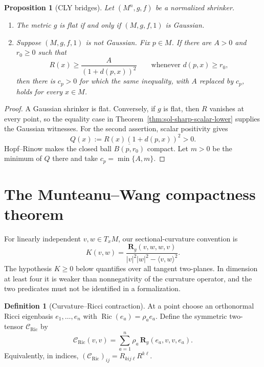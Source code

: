 \documentclass[10pt]{coll-l}
\newtheorem{proposition}[theorem]{Proposition}
\theoremstyle{definition}
\newtheorem{definition}[theorem]{Definition}
\theoremstyle{remark}
\numberwithin{section}{chapter}
\numberwithin{equation}{chapter}
\newcommand{\Ric}{\operatorname{Ric}}
\begin{document}
\begin{proposition}[CLY bridges]
\label{prop:sol-cly-source-bridges}
Let $(M^n,g,f)$ be a normalized shrinker.
\begin{enumerate}
\item The metric $g$ is flat if and only if $(M,g,f,1)$ is Gaussian.
\item Suppose $(M,g,f,1)$ is not Gaussian.  Fix $p\in M$.  If there are
      $A>0$ and $r_0\geq0$ such that
      \[
       R(x)\geq\frac{A}{(1+d(p,x))^2}
       \qquad\text{whenever }d(p,x)\geq r_0,
      \]
      then there is $c_p>0$ for which the same inequality, with $A$
      replaced by $c_p$, holds for every $x\in M$.
\end{enumerate}
\end{proposition}

\begin{proof}
A Gaussian shrinker is flat.  Conversely, if $g$ is flat, then $R$ vanishes
at every point, so the equality case in
Theorem~\ref{thm:sol-sharp-scalar-lower} supplies the Gaussian witnesses.
For the second assertion, scalar positivity gives
\[
             Q(x):=R(x)(1+d(p,x))^2>0.
\]
Hopf--Rinow makes the closed ball $\overline{B(p,r_0)}$ compact.  Let $m>0$
be the minimum of $Q$ there and take $c_p=\min\{A,m\}$.
\end{proof}

\section{The Munteanu--Wang compactness theorem}
\label{sec:sol-mw}

For linearly independent $v,w\in T_xM$, our sectional-curvature convention
is
\begin{equation}
 K(v,w)=
 \frac{\mathbf R_g(v,w,w,v)}{|v|^2|w|^2-\langle v,w\rangle^2}.          \label{eq:sol-sectional-curvature}
\end{equation}
The hypothesis $K\geq0$ below quantifies over all tangent two-planes.  In
dimension at least four it is weaker than nonnegativity of the curvature
operator, and the two predicates must not be identified in a formalization.

\begin{definition}[Curvature--Ricci contraction]
\label{def:sol-curvature-ricci-contraction}
At a point choose an orthonormal Ricci eigenbasis
$e_1,\ldots,e_n$ with $\Ric(e_a)=\rho_ae_a$.  Define the symmetric
two-tensor $\mathcal C_{\Ric}$ by
\begin{equation}
 \mathcal C_{\Ric}(v,v)
   =\sum_{a=1}^n\rho_a\,\mathbf R_g(e_a,v,v,e_a).          \label{eq:sol-curvature-ricci-contraction}
\end{equation}
Equivalently, in indices,
$(\mathcal C_{\Ric})_{ij}=R_{kij\ell}R^{k\ell}$.
\end{definition}
\end{document}
